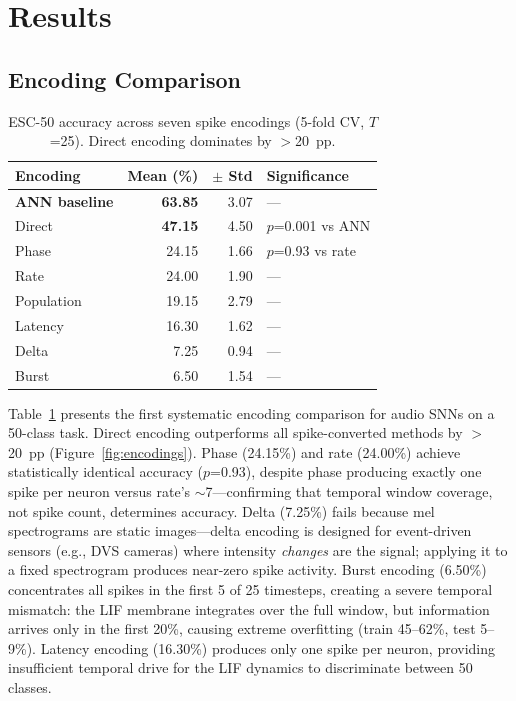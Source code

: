 \documentclass[sigconf,nonacm=false]{acmart}
\begin{document}
\section{Results}
\label{sec:results}

\subsection{Encoding Comparison}

\begin{table}[t]
\caption{ESC-50 accuracy across seven spike encodings (5-fold CV, $T$=25). Direct encoding dominates by $>$20~pp.}
\label{tab:encoding_results}
\small
\begin{tabular}{@{}lrrl@{}}
\toprule
Encoding & Mean (\%) & $\pm$ Std & Significance \\
\midrule
\textbf{ANN baseline} & \textbf{63.85} & 3.07 & --- \\
\midrule
Direct & \textbf{47.15} & 4.50 & $p$=0.001 vs ANN \\
Phase & 24.15 & 1.66 & $p$=0.93 vs rate \\
Rate & 24.00 & 1.90 & --- \\
Population & 19.15 & 2.79 & --- \\
Latency & 16.30 & 1.62 & --- \\
Delta & 7.25 & 0.94 & --- \\
Burst & 6.50 & 1.54 & --- \\
\bottomrule
\end{tabular}
\end{table}

Table~\ref{tab:encoding_results} presents the first systematic encoding comparison for audio SNNs on a 50-class task.
Direct encoding outperforms all spike-converted methods by $>$20~pp (Figure~\ref{fig:encodings}).
Phase (24.15\%) and rate (24.00\%) achieve statistically identical accuracy ($p$=0.93), despite phase producing exactly one spike per neuron versus rate's $\sim$7---confirming that temporal window coverage, not spike count, determines accuracy.
Delta (7.25\%) fails because mel spectrograms are static images---delta encoding is designed for event-driven sensors (e.g., DVS cameras) where intensity \emph{changes} are the signal; applying it to a fixed spectrogram produces near-zero spike activity.
Burst encoding (6.50\%) concentrates all spikes in the first 5 of 25 timesteps, creating a severe temporal mismatch: the LIF membrane integrates over the full window, but information arrives only in the first 20\%, causing extreme overfitting (train 45--62\%, test 5--9\%).
Latency encoding (16.30\%) produces only one spike per neuron, providing insufficient temporal drive for the LIF dynamics to discriminate between 50 classes.
\end{document}
